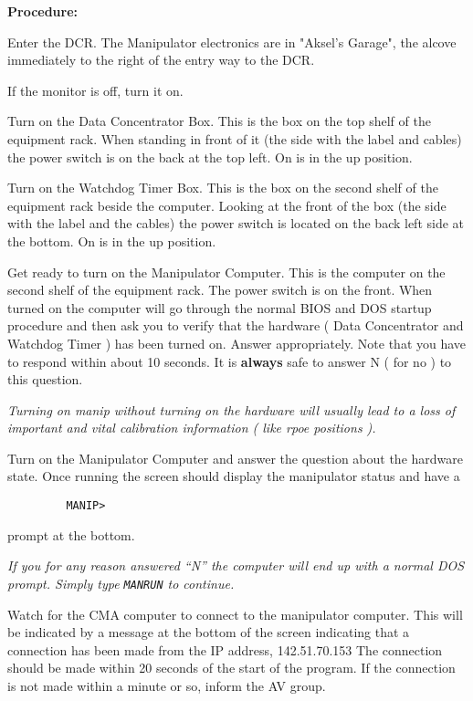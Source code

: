 \noindent
{\bf Procedure:}
\begin{enumerate}  
\checkitem Enter the DCR.  The Manipulator electronics are in "Aksel's Garage",
     the alcove immediately to the right of the entry way to the DCR.  
  
\checkitem If the monitor is off, turn it on.
  
\checkitem Turn on the Data Concentrator Box.  This is the box on the top
     shelf of the equipment rack.  When standing in front of it (the
     side with the label and cables) the power switch is on the back at
     the top left.  On is in the up position.
  
\checkitem Turn on the Watchdog Timer Box.   This is the box on the second shelf
     of the equipment rack beside the computer.  Looking at the front
     of the box (the side with the label and the cables) the power switch
     is located on the back left side at the bottom.   On is in the
     up position.
  
\checkitem Get ready to turn on the Manipulator Computer.  This is the computer on the
     second shelf of the equipment rack.  The power switch is on the
     front.  When turned on the computer will go through the normal BIOS and DOS startup procedure
     and then ask you to verify that the hardware ( Data Concentrator and Watchdog Timer )
    has been turned on. Answer appropriately. Note that you have to respond within about
10 seconds. It is {\bf always} safe to answer N ( for no ) to this question.

\small
{\em Turning on manip without turning on the hardware will usually lead to a loss of 
important and vital calibration  information ( like rpoe positions ). 
 }
\normalsize

\checkitem Turn on the Manipulator Computer and answer the question about the hardware state.
Once running the screen should
     display the manipulator status and have a 
     \begin{verbatim}
         MANIP>
\end{verbatim}
     prompt at the bottom.


\small

{\em If you for any reason answered ``N'' the computer will end up with a normal DOS prompt. 
Simply type {\tt MANRUN} to continue. }

\normalsize



\checkitem Watch for the CMA computer to connect to the manipulator 
     computer.  This will be indicated by a message at the bottom of
     the screen indicating that a connection has been made from the
     IP address,
                      142.51.70.153
     The connection should be made within 20 seconds of the start of
     the program.  If the connection is not made within a minute or
     so, inform the AV group.
   
\end{enumerate}




